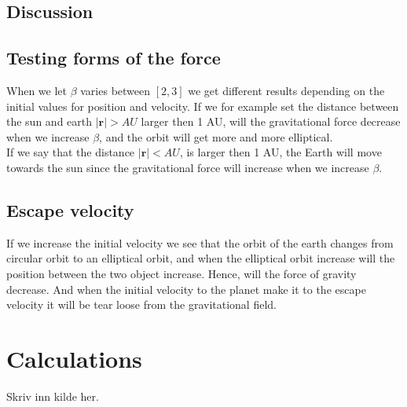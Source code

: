 \documentclass{article}
\begin{document}
\begin{multicols}{2}
\section{Discussion}
\subsection{Testing forms of the force}
When we let $\beta$ varies between $[2,3]$ we get different results depending on the initial values for position and velocity. If we for example set the distance between the sun and earth $|\mathbf{r}|>AU$ larger then 1 AU, will the gravitational force decrease when we increase $\beta$, and the orbit will get more and more elliptical. \\
If we say that the distance $|\mathbf{r}|<AU$, is larger then 1 AU, the Earth will move towards the sun since the gravitational force will increase when we increase $\beta$.    
\subsection{Escape velocity}
If we increase the initial velocity we see that the orbit of the earth changes from circular orbit to an elliptical orbit, and when the elliptical orbit increase will the position between the two object increase. Hence, will the force of gravity decrease. And when the initial velocity to the planet make it to the escape velocity it will be tear loose from the gravitational field.   
\end{multicols}



\clearpage
\appendix %
\section{Calculations} 

\begin{thebibliography}{9}
	Skriv inn kilde her.
\end{thebibliography}
\end{document}
